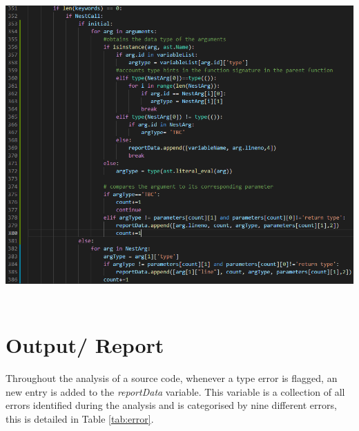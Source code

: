 \documentclass{l4proj}
\begin{document}
\begin{center}
    \includegraphics[width=\textwidth, height=12cm]{images/callHintN.png}
    \label{fig:callHintN}
\end{center}

\clearpage
\section{Output/ Report}
Throughout the analysis of a source code, whenever a type error is flagged, an new entry is added to the \textit{reportData} variable. This variable is a collection of all errors identified during the analysis and is categorised by nine different errors, this is detailed in Table \ref{tab:error}.
\end{document}
